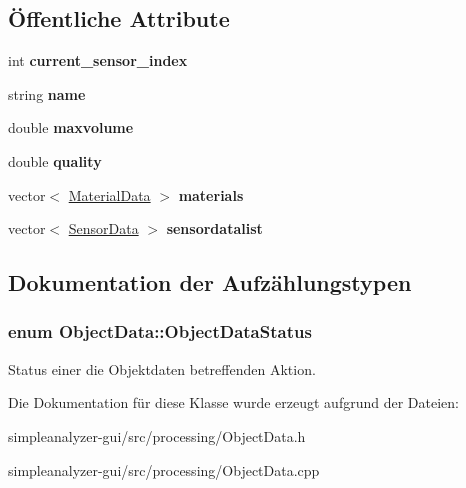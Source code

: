 \subsection*{Öffentliche Attribute}
\begin{DoxyCompactItemize}
\item 
\hypertarget{classObjectData_a86976d7029456ac75a3e011f11e8c5f7}{int {\bfseries current\-\_\-sensor\-\_\-index}}\label{classObjectData_a86976d7029456ac75a3e011f11e8c5f7}

\item 
\hypertarget{classObjectData_a6d900f11952e9d50e6660a3695fad99d}{string {\bfseries name}}\label{classObjectData_a6d900f11952e9d50e6660a3695fad99d}

\item 
\hypertarget{classObjectData_a5cc67da17022ec0f6eed6d02fa975a8b}{double {\bfseries maxvolume}}\label{classObjectData_a5cc67da17022ec0f6eed6d02fa975a8b}

\item 
\hypertarget{classObjectData_ae047918932000aca3ff1bc680b288c08}{double {\bfseries quality}}\label{classObjectData_ae047918932000aca3ff1bc680b288c08}

\item 
\hypertarget{classObjectData_a353002eeb054efed800db1b798d08a6c}{vector$<$ \hyperlink{structMaterialData}{Material\-Data} $>$ {\bfseries materials}}\label{classObjectData_a353002eeb054efed800db1b798d08a6c}

\item 
\hypertarget{classObjectData_a43fbf8d2e99c444db3608c2f009de34f}{vector$<$ \hyperlink{structUtils_1_1SensorData}{Sensor\-Data} $>$ {\bfseries sensordatalist}}\label{classObjectData_a43fbf8d2e99c444db3608c2f009de34f}

\end{DoxyCompactItemize}


\subsection{Dokumentation der Aufzählungstypen}
\hypertarget{classObjectData_a20e8cd3cd0f8af3b571b9393aa9e6484}{
\subsubsection[{Object\-Data\-Status}]{\setlength{\rightskip}{0pt plus 5cm}enum {\bf Object\-Data\-::\-Object\-Data\-Status}}}\label{classObjectData_a20e8cd3cd0f8af3b571b9393aa9e6484}
Status einer die Objektdaten betreffenden Aktion. 

Die Dokumentation für diese Klasse wurde erzeugt aufgrund der Dateien\-:\begin{DoxyCompactItemize}
\item 
simpleanalyzer-\/gui/src/processing/Object\-Data.\-h\item 
simpleanalyzer-\/gui/src/processing/Object\-Data.\-cpp\end{DoxyCompactItemize}
